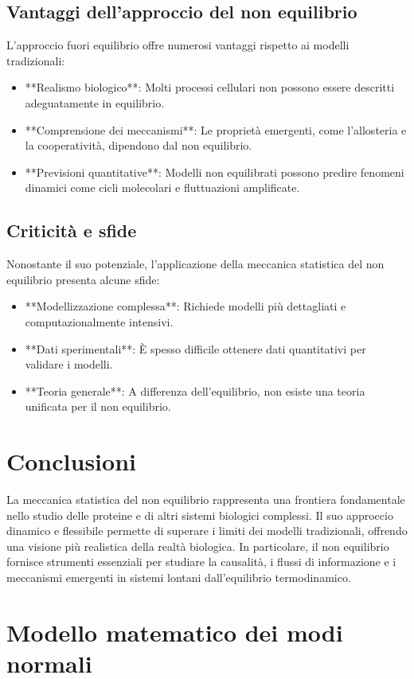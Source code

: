 \documentclass[Lau,binding=0.6cm,oneside,noexaminfo]{sapthesis}
\begin{document}
\subsection{Vantaggi dell'approccio del non equilibrio}
L'approccio fuori equilibrio offre numerosi vantaggi rispetto ai modelli tradizionali:
\begin{itemize}
    \item **Realismo biologico**: Molti processi cellulari non possono essere descritti adeguatamente in equilibrio.
    \item **Comprensione dei meccanismi**: Le proprietà emergenti, come l'allosteria e la cooperatività, dipendono dal non equilibrio.
    \item **Previsioni quantitative**: Modelli non equilibrati possono predire fenomeni dinamici come cicli molecolari e fluttuazioni amplificate.
\end{itemize}

\subsection{Criticità e sfide}
Nonostante il suo potenziale, l'applicazione della meccanica statistica del non equilibrio presenta alcune sfide:
\begin{itemize}
    \item **Modellizzazione complessa**: Richiede modelli più dettagliati e computazionalmente intensivi.
    \item **Dati sperimentali**: È spesso difficile ottenere dati quantitativi per validare i modelli.
    \item **Teoria generale**: A differenza dell'equilibrio, non esiste una teoria unificata per il non equilibrio.
\end{itemize}

\section{Conclusioni}
La meccanica statistica del non equilibrio rappresenta una frontiera fondamentale nello studio delle proteine e di altri sistemi biologici complessi. Il suo approccio dinamico e flessibile permette di superare i limiti dei modelli tradizionali, offrendo una visione più realistica della realtà biologica. In particolare, il non equilibrio fornisce strumenti essenziali per studiare la causalità, i flussi di informazione e i meccanismi emergenti in sistemi lontani dall'equilibrio termodinamico.


\section{Modello matematico dei modi normali}
\end{document}
